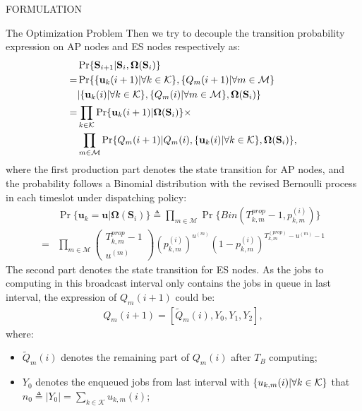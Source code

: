 \documentclass[10pt, conference, letterpaper]{IEEEtran}
\newcommand{\define}{\triangleq}
\renewcommand{\vec}{\mathbf}
\DeclarePairedDelimiter{\set}{\{}{\}}
\newcommand{\apSet}{\mathcal{K}}
\newcommand{\esSet}{\mathcal{M}}
\newcommand{\Stat}{\mathbf{S}}
\newcommand{\Policy}{\mathbf{\Omega}}
\begin{document}
\begin{section}{FORMULATION}
\begin{subsection}{The Optimization Problem}
            Then we try to decouple the transition probability expression on AP nodes and ES nodes respectively as:
            \begin{align}
                & \Pr\{\Stat_{i+1}|\Stat_{i}, \Policy(\Stat_{i})\} 
                \nonumber\\
                =& \Pr\{\set{\vec{u}_k(i+1)|\forall k\in\apSet}, \set{Q_m(i+1)|\forall m\in\esSet}
                    \nonumber\\
                    &|\set{\vec{u}_k(i)|\forall k\in\apSet}, \set{Q_m(i)|\forall m\in\esSet}, \Policy(\Stat_{i})\}
                \nonumber\\
                =& \prod_{k\in\apSet} \Pr\{\vec{u}_k(i+1)|\Policy(\Stat_{i})\} \times
                    \nonumber\\
                    & \prod_{m\in\esSet} \Pr\{Q_m(i+1)|Q_m(i), \set{\vec{u}_k(i)|\forall k\in\apSet}, \Policy(\Stat_{i})\},
            \end{align}
            where the first production part denotes the state transition for AP nodes, and the probability follows a Binomial distribution with the revised Bernoulli process in each timeslot under dispatching policy:
            \begin{align}
                &\Pr\{\vec{u}_k=\vec{u}|\Policy(\Stat_i)\} \define \prod_{m\in\esSet}  \Pr\{Bin(T^{prop}_{k,m}-1,p^{(i)}_{k,m})\}
                \nonumber\\
                =& \prod_{m\in\esSet}
                    \begin{pmatrix}
                        T^{prop}_{k,m}-1 \\ u^{(m)}
                    \end{pmatrix}
                    (p^{(i)}_{k,m})^{u^{(m)}}
                    (1-p^{(i)}_{k,m})^{T^{(prop)}_{k,m}-u^{(m)}-1}
            \end{align}
            The second part denotes the state transition for ES nodes. As the jobs to computing in this broadcast interval only contains the jobs in queue in last interval, the expression of $Q_m(i+1)$ could be:
            \begin{align}
                Q_m(i+1) = [\tilde{Q}_m(i), Y_0, Y_1, Y_2],
            \end{align}
            where:
            \begin{itemize}
                \item $\tilde{Q}_m(i)$ denotes the remaining part of $Q_m(i)$ after $T_B$ computing;
                \item $Y_0$ denotes the enqueued jobs from last interval with $\set{u_{k,m}(i)|\forall k\in\apSet}$ that $n_0 \define |Y_0|=\sum_{k\in\apSet} u_{k,m}(i)$;

\end{itemize}
\end{subsection}
\end{section}
\end{document}
